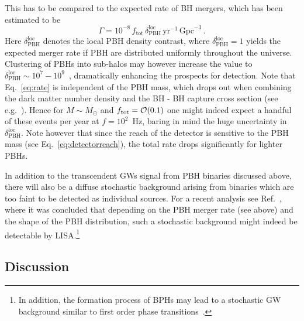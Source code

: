 This has to be compared to the expected rate of BH mergers, which has been estimated to be~\cite{Bird:2016dcv,Clesse:2016vqa,Sasaki:2016jop}
\begin{equation}
\Gamma =  10^{-8} \, f_\text{tot} \, \delta_\text{PBH}^\text{loc}\, \text{yr}^{-1}\,  \text{Gpc}^{-3} \,.
\label{eq:rate}
\end{equation}
Here $\delta_\text{PBH}^\text{loc}$ denotes the local PBH density contrast, where $\delta_\text{PBH}^\text{loc} = 1$ yields the expected merger rate if PBH are distributed uniformly throughout the universe. Clustering of PBHs into sub-halos may however increase the value to $\delta_\text{PBH}^\text{loc} \sim 10^7 - 10^9$~\cite{Clesse:2016vqa}, dramatically enhancing the prospects for detection. Note that Eq.~\eqref{eq:rate} is independent of the PBH mass, which drops out when combining the dark matter number density and the BH - BH capture cross section (see e.g.~\cite{Bird:2016dcv}). Hence for $M \sim M_\odot$ and $f_\text{tot} = {\cal O}(0.1)$ one might indeed expect a handful of these events per year at $f = 10^2$~Hz, baring in mind the huge uncertainty in $\delta_\text{PBH}^\text{loc}$.  Note however that since the reach of the detector is sensitive to the PBH mass (see Eq.~\eqref{eq:detectorreach}), the total rate drops significantly for lighter PBHs.

In addition to the transcendent GWs signal from PBH binaries discussed above, there will also be a diffuse stochastic background arising from binaries which are too faint to be detected as individual sources. For a recent analysis see Ref.~\cite{Clesse:2016ajp}, where it was concluded that depending on the PBH merger rate (see above) and the shape of the PBH distribution, such a stochastic background might indeed be detectable by LISA.\footnote{In addition, the formation process of BPHs
may lead to a stochastic GW background similar to first order phase transitions~\cite{Garcia-Bellido:2017fdg}. }



\subsection{Discussion}

